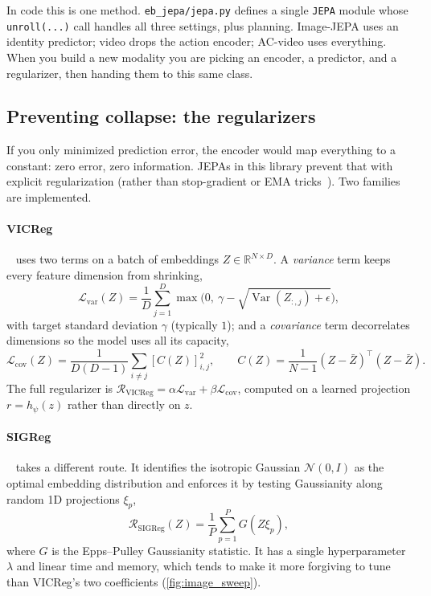 \documentclass{article}
\newcommand{\code}[1]{\texttt{\small #1}}
\newcommand{\file}[1]{\texttt{\small #1}}
\begin{document}
\begin{notebox}
In code this is one method. \file{eb\_jepa/jepa.py} defines a single
\code{JEPA} module whose \code{unroll(...)} call handles all three settings,
plus planning. Image-JEPA uses an identity predictor; video drops the action
encoder; AC-video uses everything. When you build a new modality you are picking
an encoder, a predictor, and a regularizer, then handing them to this same class.
\end{notebox}

\subsection{Preventing collapse: the regularizers}

If you only minimized prediction error, the encoder would map everything to a
constant: zero error, zero information. JEPAs in this library prevent that with
explicit regularization (rather than stop-gradient or EMA
tricks~\citep{BYOL,SimSiam}). Two families are implemented.

\paragraph{VICReg}~\citep{VICReg} uses two terms on a batch of embeddings
$Z \in \mathbb{R}^{N \times D}$. A \emph{variance} term keeps every feature
dimension from shrinking,
\begin{equation}
\mathcal{L}_{\text{var}}(Z) = \frac{1}{D}\sum_{j=1}^{D} \max\!\Big(0,\ \gamma - \sqrt{\operatorname{Var}(Z_{:,j}) + \epsilon}\Big),
\label{eq:var}
\end{equation}
with target standard deviation $\gamma$ (typically $1$); and a \emph{covariance}
term decorrelates dimensions so the model uses all its capacity,
\begin{equation}
\mathcal{L}_{\text{cov}}(Z) = \frac{1}{D(D-1)}\sum_{i\neq j} [C(Z)]_{i,j}^2,
\qquad C(Z) = \frac{1}{N-1}(Z - \bar{Z})^\top (Z - \bar{Z}).
\label{eq:cov}
\end{equation}
The full regularizer is $\mathcal{R}_{\text{VICReg}} = \alpha \mathcal{L}_{\text{var}} + \beta \mathcal{L}_{\text{cov}}$,
computed on a learned projection $r = h_\psi(z)$ rather than directly on $z$.

\paragraph{SIGReg}~\citep{balestriero2025lejepaprovablescalableselfsupervised}
takes a different route. It identifies the isotropic Gaussian $\mathcal{N}(0, I)$
as the optimal embedding distribution and enforces it by testing Gaussianity
along random 1D projections $\xi_p$,
\begin{equation}
\mathcal{R}_{\text{SIGReg}}(Z) = \frac{1}{P}\sum_{p=1}^{P} G(Z\xi_p),
\label{eq:sigreg}
\end{equation}
where $G$ is the Epps--Pulley Gaussianity statistic. It has a single
hyperparameter $\lambda$ and linear time and memory, which tends to make it more
forgiving to tune than VICReg's two coefficients (\cref{fig:image_sweep}).
\end{document}
